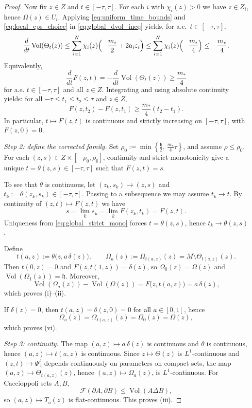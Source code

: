 \documentclass[12pt,english]{article}
\theoremstyle{definition}
\begin{document}
\begin{proof}
Now fix $z\in Z$ and $t\in[-\tau,\tau]$. For each $i$ with $\chi_i(z)>0$ we have $z\in Z_i$, hence $\Omega(z)\in U_i$.
Applying \eqref{eq:uniform_time_bounds} and \eqref{eq:local_eps_choice} in \eqref{eq:global_dvol_ineq} yields, for a.e.\ $t\in[-\tau,\tau]$,
\[
\frac{d}{dt}\operatorname{Vol}(\Theta_t(z))
\le \sum_{i=1}^N \chi_i(z)\Bigl(-\frac{m_i}{2}+2a_i\varepsilon_i\Bigr)
\le \sum_{i=1}^N \chi_i(z)\Bigl(-\frac{m_i}{4}\Bigr)
\le -\frac{m_\ast}{4}.
\]
Equivalently,
\[
\frac{d}{dt}F(z,t)=-\frac{d}{dt}\operatorname{Vol}(\Theta_t(z))\ge \frac{m_\ast}{4}
\]
for a.e. $t\in[-\tau,\tau]$ and all $z\in Z$. Integrating and using absolute continuity yields: for all $-\tau\le t_1\le t_2\le \tau$ and $z\in Z$,
\begin{equation}\label{eq:global_strict_mono}
F(z,t_2)-F(z,t_1)\ge \frac{m_\ast}{4}(t_2-t_1).
\end{equation}
In particular, $t\mapsto F(z,t)$ is continuous and strictly increasing on $[-\tau,\tau]$, with $F(z,0)=0$.

\smallskip
\noindent\emph{Step 2: define the corrected family.}
Set $\rho_0:=\min\left\{\frac{\mathfrak h}{2},\,\frac{m_\ast}{4}\tau\right\}$, and assume $\rho\le \rho_0$.
For each $(z,s)\in Z\times[-\rho_0,\rho_0]$, continuity and strict monotonicity give a unique
$t=\theta(z,s)\in[-\tau,\tau]$ such that $F(z,t)=s$.

To see that $\theta$ is continuous, let $(z_k,s_k)\to(z,s)$ and $t_k:=\theta(z_k,s_k)\in[-\tau,\tau]$.
Passing to a subsequence we may assume $t_k\to t$. By continuity of $(z,t)\mapsto F(z,t)$ we have
\[
s=\lim_k s_k=\lim_k F(z_k,t_k)=F(z,t).
\]
Uniqueness from \eqref{eq:global_strict_mono} forces $t=\theta(z,s)$, hence $t_k\to\theta(z,s)$.

Define
\[
t(a,z):=\theta\bigl(z,a\,\delta(z)\bigr),
\qquad
\Omega_a(z):=\Omega_{t(a,z)}(z)=M\setminus \Theta_{t(a,z)}(z).
\]
Then $t(0,z)=0$ and $F(z,t(1,z))=\delta(z)$, so $\Omega_0(z)=\Omega(z)$ and $\operatorname{Vol}(\Omega_1(z))=\mathfrak h.$
Moreover,
\[
\operatorname{Vol}(\Omega_a(z))-\operatorname{Vol}(\Omega(z))=F\bigl(z,t(a,z)\bigr)=a\,\delta(z),
\]
which proves (i)--(ii).

If $\delta(z)=0$, then $t(a,z)=\theta(z,0)=0$ for all $a\in[0,1]$, hence
\[
\Omega_a(z)=\Omega_{t(a,z)}(z)=\Omega_0(z)=\Omega(z),
\]
which proves (vi).

\smallskip
\noindent\emph{Step 3: continuity.}
The map $(a,z)\mapsto a\,\delta(z)$ is continuous and $\theta$ is continuous, hence $(a,z)\mapsto t(a,z)$ is continuous.
Since $z\mapsto \Theta(z)$ is $L^1$-continuous and $(z,t)\mapsto \Phi_z^t$ depends continuously on parameters on compact sets,
the map $(a,z)\mapsto \Theta_{t(a,z)}(z)$, hence $(a,z)\mapsto \Omega_a(z)$, is $L^1$-continuous.
For Caccioppoli sets $A,B$,
\[
\mathcal F(\partial A,\partial B)\le \operatorname{Vol}(A\Delta B),
\]
so $(a,z)\mapsto T_a(z)$ is flat-continuous. This proves (iii).


\end{proof}
\end{document}
